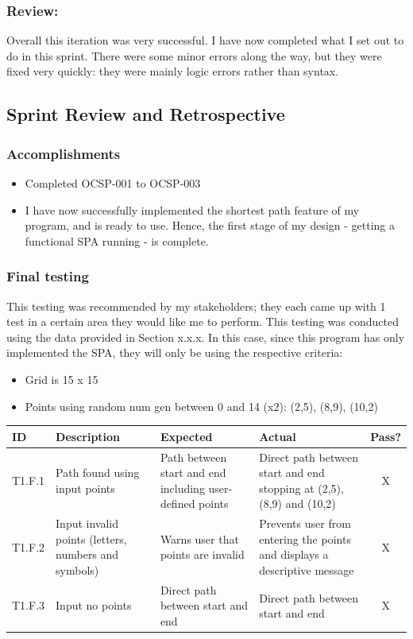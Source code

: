 \subsubsection{Review:}
 Overall this iteration was very successful. I have now completed what I set out to do in this sprint. There were some minor errors along the way, but they were fixed very quickly: they were mainly logic errors rather than syntax.

\clearpage
\subsection{Sprint Review and Retrospective}

\subsubsection{Accomplishments}
\begin{itemize}
    \item Completed OCSP-001 to OCSP-003
    \item  I have now successfully implemented the shortest path feature of my program, and is ready to use. Hence, the first stage of my design - getting a functional SPA running - is complete.
\end{itemize}

\subsubsection{Final testing}

This testing was recommended by my stakeholders; they each came up with 1 test in a certain area they would like me to perform. This testing was conducted using the data provided in Section x.x.x. In this case, since this program has only implemented the SPA, they will only be using the respective criteria:

\begin{itemize}
\item Grid is 15 x 15
\item Points using random num gen between 0 and 14 (x2): (2,5), (8,9), (10,2) 

\end{itemize}

\begin{table}[htbp]
\centering
\begin{tabularx}{\textwidth}{|l|X|p{3.5cm}|p{3.5cm}|c|}
\hline
\textbf{ID} & \textbf{Description} & \textbf{Expected} & \textbf{Actual} & \textbf{Pass?} \\
\hline
T1.F.1 & Path found using input points & Path between start and end including user-defined points& Direct path between start and end stopping at (2,5), (8,9) and (10,2)  & X \\
\hline
T1.F.2 & Input invalid points (letters, numbers and symbols) & Warns user that points are invalid & Prevents user from entering the points and displays a descriptive message & X \\
\hline
T1.F.3 & Input no points &  Direct path between start and end & Direct path between start and end & X \\
\hline
\end{tabularx}
\end{table}

